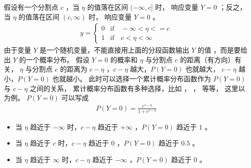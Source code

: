 \documentclass[letterpaper,10pt,english]{sphinxmanual}
\begin{document}
假设有一个分割点 \(c\)
，当 \(\eta\) 的值落在区间 \((-\infty,c]\) 时，
响应变量 \(Y=0\)
；反之，当 \(\eta\) 的值落在区间 \((c,\infty)\) 时，
响应变量 \(Y=0\)
。
\begin{equation}\label{equation:有序离散模型/content:eq_ordered_logistic_004}
\begin{split}y=
\begin{cases}
0& \text{if}\quad -\infty < \eta <= c\\
1& \text{if} \quad  c< \eta < \infty
\end{cases}\end{split}
\end{equation}
由于变量 \(Y\) 是一个随机变量，不能直接用上面的分段函数输出 \(Y\) 的值
，而是要给出 \(Y\) 的一个概率分布。
假设 \(Y=0\) 的概率和 \(\eta\) 与分割点 \(c\) 的距离（有方向）有关，
\(\eta\) 与分割点 \(c\) 的距离为 \(c-\eta\)
，\(c-\eta\) 越大，\(P(Y=0)\) 也就越大，
\(c-\eta\) 越小，\(P(Y=0)\) 也就越小。
此时可以选择一个累计概率分布函数作为 \(P(Y=0)\) 与 \(c-\eta\)
之间的关系，
累计概率分布函数有多种选择，比如
 ， ， 等等，
这里以  为例。
\(P(Y=0)\) 可以写成
\begin{equation}\label{equation:有序离散模型/content:eq_ordered_logistic_005}
\begin{split}P(Y=0) =
\frac{e^{c-\eta}}{1+e^{c-\eta}}\end{split}
\end{equation}\begin{itemize}
\item {} 
当 \(\eta\) 趋近于 \(-\infty\) 时，\(c-\eta\) 趋近于 \(+\infty\) ，\(P(Y=0)\) 趋近于 \(1\) 。

\item {} 
当 \(\eta\) 趋近于 \(c\) 时，\(c-\eta\) 趋近于 \(0\) ，\(P(Y=0)\) 趋近于 \(0.5\) 。

\item {} 
当 \(\eta\) 趋近于 \(\infty\) 时，\(c-\eta\) 趋近于 \(-\infty\) ，\(P(Y=0)\) 趋近于 \(0\) 。

\end{itemize}
\end{document}

